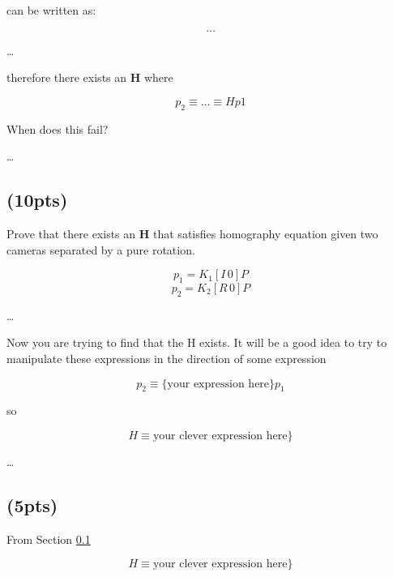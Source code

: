 \documentclass[12pt]{article}
\begin{document}
can be written as:

\begin{equation}
  \ldots
\end{equation}

\ldots

therefore there exists an $\bm{H}$ where

\begin{equation}
  p_2 \equiv \ldots \equiv Hp1
\end{equation}

When does this fail?

\ldots


\pagebreak

\subsection{(10pts)}
\label{rot}

Prove that there exists an $\bm{H}$ that satisfies homography equation given two cameras separated by a pure rotation.

\begin{equation*}
  p_1 = K_1 [I\,0] P
\end{equation*}
\begin{equation}
  p_2 = K_2 [R\, 0] P
\end{equation}

\ldots

Now you are trying to find that the H exists. It will be a good idea to try to manipulate these expressions in the
direction of some expression

\begin{equation}
  p_2 \equiv \{ \mbox{your expression here} \} p_1
\end{equation}

so

\begin{equation}
  H \equiv \mbox{your clever expression here} \}
\end{equation}

\ldots



\subsection{(5pts)}

From Section \ref{rot}

\begin{equation}
  H \equiv \mbox{your clever expression here} \}
\end{equation}
\end{document}
